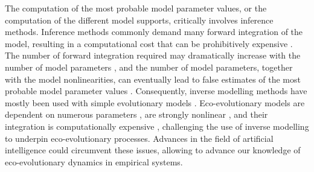 The computation of the most probable model parameter values, or the computation of the different model supports, critically involves inference methods. %
% 
Inference methods commonly demand many forward integration of the model, resulting in a computational cost that can be prohibitively expensive \citep{Schneider2017}.
% 
The number of forward integration required may dramatically increase with the number of model parameters \citep{Csillery2010}, and the number of model parameters, together with the model nonlinearities, can eventually lead to false estimates of the most probable model parameter values \xxx.
% 
% 
Consequently, inverse modelling methods have mostly been used with simple evolutionary models \citep{Csillery2010}. 
% 
Eco-evolutionary models are dependent on numerous parameters \citep{Boyd2012}, are strongly nonlinear \citep{Hastings1993,Huisman1999,Beninca2008}, and their integration is computationally expensive \citep{Fisher2018}, challenging the use of inverse modelling to underpin eco-evolutionary processes. 
% 
Advances in the field of artificial intelligence could circumvent these issues, allowing to advance our knowledge of eco-evolutionary dynamics in empirical systems.  
% 
% 
% 
% 

